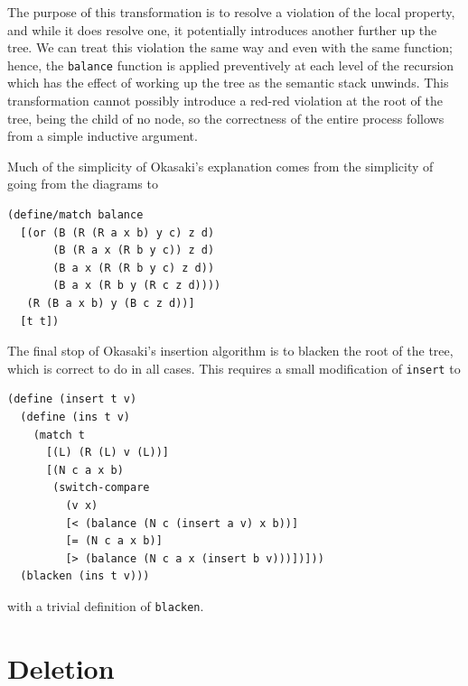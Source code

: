 \documentclass[preprint]{sigplanconf}
\begin{document}
The purpose of this transformation is to resolve a violation of the local property, and while it does resolve one, it potentially introduces another further up the tree. We can treat this violation the same way and even with the same function; hence, the \texttt{balance} function is applied preventively at each level of the recursion which has the effect of working up the tree as the semantic stack unwinds. This transformation cannot possibly introduce a red-red violation at the root of the tree, being the child of no node, so the correctness of the entire process follows from a simple inductive argument.

Much of the simplicity of Okasaki's explanation comes from the simplicity of going from the diagrams to
\begin{verbatim}
(define/match balance
  [(or (B (R (R a x b) y c) z d)
       (B (R a x (R b y c)) z d)
       (B a x (R (R b y c) z d))
       (B a x (R b y (R c z d))))
   (R (B a x b) y (B c z d))]
  [t t])
\end{verbatim}

The final stop of Okasaki's insertion algorithm is to blacken the root of the tree, which is correct to do in all cases. This requires a small modification of \texttt{insert} to 
\begin{verbatim}
(define (insert t v)
  (define (ins t v)
    (match t
      [(L) (R (L) v (L))]
      [(N c a x b)
       (switch-compare
         (v x)
         [< (balance (N c (insert a v) x b))]
         [= (N c a x b)]
         [> (balance (N c a x (insert b v)))])]))
  (blacken (ins t v)))
\end{verbatim}
with a trivial definition of \texttt{blacken}.




\section{Deletion}
\end{document}
